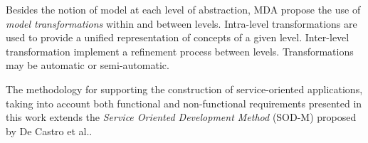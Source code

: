 Besides the notion of model at each level of abstraction, MDA propose the use of \textit{model transformations} within and between levels. Intra-level transformations are used to provide a unified representation of concepts of a given level. Inter-level transformation implement a refinement process between levels. Transformations may be automatic or semi-automatic.


The methodology for supporting the construction of service-oriented applications, taking into account both functional and non-functional requirements presented in this work extends the \textit{Service Oriented Development Method} (SOD-M) proposed by De Castro et al.\cite{decastro1}.
